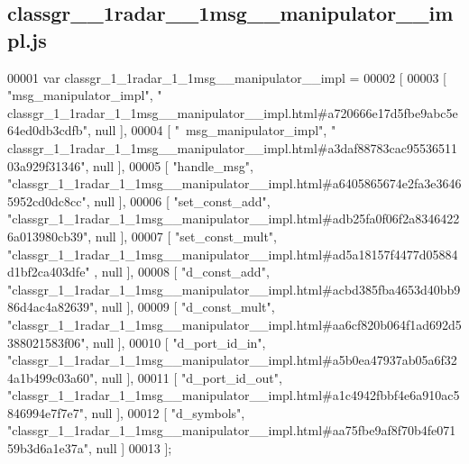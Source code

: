 \subsection{classgr\+\_\+\_\+1radar\+\_\+\_\+1msg\+\_\+\+\_\+manipulator\+\_\+\+\_\+impl.\+js}
\label{classgr__1__1radar__1__1msg____manipulator____impl_8js_source}

\begin{DoxyCode}
00001 var classgr_1_1radar_1_1msg__manipulator__impl =
00002 [
00003     [ \textcolor{stringliteral}{"msg\_manipulator\_impl"}, \textcolor{stringliteral}{"
      classgr\_1\_1radar\_1\_1msg\_\_manipulator\_\_impl.html#a720666e17d5fbe9abc5e64ed0db3cdfb"}, null ],
00004     [ \textcolor{stringliteral}{"~msg\_manipulator\_impl"}, \textcolor{stringliteral}{"
      classgr\_1\_1radar\_1\_1msg\_\_manipulator\_\_impl.html#a3daf88783cac9553651103a929f31346"}, null ],
00005     [ \textcolor{stringliteral}{"handle\_msg"}, \textcolor{stringliteral}{"classgr\_1\_1radar\_1\_1msg\_\_manipulator\_\_impl.html#a6405865674e2fa3e36465952cd0dc8cc"}, 
      null ],
00006     [ \textcolor{stringliteral}{"set\_const\_add"}, \textcolor{stringliteral}{"classgr\_1\_1radar\_1\_1msg\_\_manipulator\_\_impl.html#adb25fa0f06f2a83464226a013980cb39"},
       null ],
00007     [ \textcolor{stringliteral}{"set\_const\_mult"}, \textcolor{stringliteral}{"classgr\_1\_1radar\_1\_1msg\_\_manipulator\_\_impl.html#ad5a18157f4477d05884d1bf2ca403dfe"}
      , null ],
00008     [ \textcolor{stringliteral}{"d\_const\_add"}, \textcolor{stringliteral}{"classgr\_1\_1radar\_1\_1msg\_\_manipulator\_\_impl.html#acbd385fba4653d40bb986d4ac4a82639"}, 
      null ],
00009     [ \textcolor{stringliteral}{"d\_const\_mult"}, \textcolor{stringliteral}{"classgr\_1\_1radar\_1\_1msg\_\_manipulator\_\_impl.html#aa6cf820b064f1ad692d5388021583f06"}, 
      null ],
00010     [ \textcolor{stringliteral}{"d\_port\_id\_in"}, \textcolor{stringliteral}{"classgr\_1\_1radar\_1\_1msg\_\_manipulator\_\_impl.html#a5b0ea47937ab05a6f324a1b499c03a60"}, 
      null ],
00011     [ \textcolor{stringliteral}{"d\_port\_id\_out"}, \textcolor{stringliteral}{"classgr\_1\_1radar\_1\_1msg\_\_manipulator\_\_impl.html#a1c4942fbbf4e6a910ac5846994e7f7e7"},
       null ],
00012     [ \textcolor{stringliteral}{"d\_symbols"}, \textcolor{stringliteral}{"classgr\_1\_1radar\_1\_1msg\_\_manipulator\_\_impl.html#aa75fbe9af8f70b4fe07159b3d6a1e37a"}, 
      null ]
00013 ];
\end{DoxyCode}
